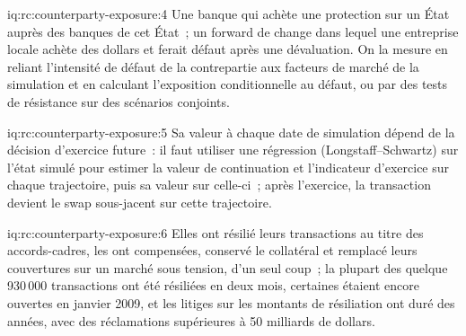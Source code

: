 \begin{solution}{iq:rc:counterparty-exposure:4}
Une banque qui achète une protection sur un État auprès des banques de cet État~; un forward de change dans lequel
une entreprise locale achète des dollars et ferait défaut après une dévaluation. On la mesure en reliant
l'intensité de défaut de la contrepartie aux facteurs de marché de la simulation et en calculant l'exposition
conditionnelle au défaut, ou par des tests de résistance sur des scénarios conjoints.
\end{solution}

\begin{solution}{iq:rc:counterparty-exposure:5}
Sa valeur à chaque date de simulation dépend de la décision d'exercice future~: il faut utiliser une régression
(Longstaff--Schwartz) sur l'état simulé pour estimer la valeur de continuation et l'indicateur d'exercice sur
chaque trajectoire, puis sa valeur sur celle-ci~; après l'exercice, la transaction
devient le swap sous-jacent sur cette trajectoire.
\end{solution}

\begin{solution}{iq:rc:counterparty-exposure:6}
Elles ont résilié leurs transactions au titre des accords-cadres, les ont compensées, conservé le collatéral et
remplacé leurs couvertures sur un marché sous tension, d'un seul coup~; la plupart des quelque 930\,000 transactions
ont été résiliées en deux mois, certaines étaient encore ouvertes en janvier 2009, et les litiges sur les
montants de résiliation ont duré des années, avec des réclamations supérieures à 50 milliards de dollars.
\end{solution}
